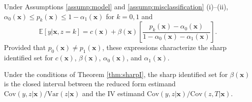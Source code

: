 \begin{thm}
  Under Assumptions \ref{assump:model} and \ref{assump:misclassification} (i)--(ii), $\alpha_0(\mathbf{x}) \leq p_k(\mathbf{x}) \leq 1 -  \alpha_1(\mathbf{x})$ for  $k = 0, 1$ and
  \begin{equation}
    \mathbb{E}[y|\mathbf{x},z=k] = c(\mathbf{x}) + \beta(\mathbf{x}) \left[\frac{p_k(\mathbf{x}) - \alpha_0(\mathbf{x})}{1 - \alpha_0(\mathbf{x}) - \alpha_1(\mathbf{x})}\right].
    \label{eq:identsetI}
  \end{equation}
Provided that $p_0(\mathbf{x}) \neq p_1(\mathbf{x})$, these expressions characterize the sharp identified set for $c(\mathbf{x})$, $\beta(\mathbf{x})$, $\alpha_0(\mathbf{x})$, and $\alpha_1(\mathbf{x})$.
  \label{thm:sharpI}
\end{thm}


\begin{cor}
  Under the conditions of Theorem \ref{thm:sharpI}, the sharp identified set for $\beta(\mathbf{x})$ is the closed interval between the reduced form estimand $\mbox{Cov}(y,z|\mathbf{x})/\mbox{Var}(z|\mathbf{x})$ and the IV estimand $\mbox{Cov}(y,z|\mathbf{x})/\mbox{Cov}(z,T|\mathbf{x})$.
\label{cor:sharpBeta1}
\end{cor}

